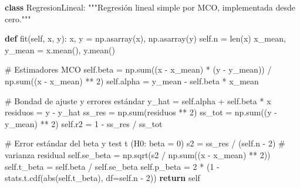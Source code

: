\documentclass[
  spanish,
  letterpaper,
  DIV=11,
  numbers=noendperiod]{scrreprt}
\newenvironment{Shaded}{\begin{snugshade}}{\end{snugshade}}
\newcommand{\BuiltInTok}[1]{\textcolor[rgb]{0.00,0.23,0.31}{#1}}
\newcommand{\CommentTok}[1]{\textcolor[rgb]{0.37,0.37,0.37}{#1}}
\newcommand{\ControlFlowTok}[1]{\textcolor[rgb]{0.00,0.23,0.31}{\textbf{#1}}}
\newcommand{\DecValTok}[1]{\textcolor[rgb]{0.68,0.00,0.00}{#1}}
\newcommand{\KeywordTok}[1]{\textcolor[rgb]{0.00,0.23,0.31}{\textbf{#1}}}
\newcommand{\NormalTok}[1]{\textcolor[rgb]{0.00,0.23,0.31}{#1}}
\newcommand{\OperatorTok}[1]{\textcolor[rgb]{0.37,0.37,0.37}{#1}}
\newcommand{\VariableTok}[1]{\textcolor[rgb]{0.07,0.07,0.07}{#1}}
\begin{document}
\label{clase-regresion}
\begin{Shaded}
\begin{Highlighting}[]
\KeywordTok{class}\NormalTok{ RegresionLineal:}
    \CommentTok{"""Regresión lineal simple por MCO, implementada desde cero."""}

    \KeywordTok{def}\NormalTok{ fit(}\VariableTok{self}\NormalTok{, x, y):}
\NormalTok{        x, y }\OperatorTok{=}\NormalTok{ np.asarray(x), np.asarray(y)}
        \VariableTok{self}\NormalTok{.n }\OperatorTok{=} \BuiltInTok{len}\NormalTok{(x)}
\NormalTok{        x\_mean, y\_mean }\OperatorTok{=}\NormalTok{ x.mean(), y.mean()}

        \CommentTok{\# Estimadores MCO}
        \VariableTok{self}\NormalTok{.beta }\OperatorTok{=}\NormalTok{ np.}\BuiltInTok{sum}\NormalTok{((x }\OperatorTok{{-}}\NormalTok{ x\_mean) }\OperatorTok{*}\NormalTok{ (y }\OperatorTok{{-}}\NormalTok{ y\_mean)) }\OperatorTok{/}\NormalTok{ np.}\BuiltInTok{sum}\NormalTok{((x }\OperatorTok{{-}}\NormalTok{ x\_mean) }\OperatorTok{**} \DecValTok{2}\NormalTok{)}
        \VariableTok{self}\NormalTok{.alpha }\OperatorTok{=}\NormalTok{ y\_mean }\OperatorTok{{-}} \VariableTok{self}\NormalTok{.beta }\OperatorTok{*}\NormalTok{ x\_mean}

        \CommentTok{\# Bondad de ajuste y errores estándar}
\NormalTok{        y\_hat }\OperatorTok{=} \VariableTok{self}\NormalTok{.alpha }\OperatorTok{+} \VariableTok{self}\NormalTok{.beta }\OperatorTok{*}\NormalTok{ x}
\NormalTok{        residuos }\OperatorTok{=}\NormalTok{ y }\OperatorTok{{-}}\NormalTok{ y\_hat}
\NormalTok{        ss\_res }\OperatorTok{=}\NormalTok{ np.}\BuiltInTok{sum}\NormalTok{(residuos }\OperatorTok{**} \DecValTok{2}\NormalTok{)}
\NormalTok{        ss\_tot }\OperatorTok{=}\NormalTok{ np.}\BuiltInTok{sum}\NormalTok{((y }\OperatorTok{{-}}\NormalTok{ y\_mean) }\OperatorTok{**} \DecValTok{2}\NormalTok{)}
        \VariableTok{self}\NormalTok{.r2 }\OperatorTok{=} \DecValTok{1} \OperatorTok{{-}}\NormalTok{ ss\_res }\OperatorTok{/}\NormalTok{ ss\_tot}

        \CommentTok{\# Error estándar del beta y test t (H0: beta = 0)}
\NormalTok{        s2 }\OperatorTok{=}\NormalTok{ ss\_res }\OperatorTok{/}\NormalTok{ (}\VariableTok{self}\NormalTok{.n }\OperatorTok{{-}} \DecValTok{2}\NormalTok{)                       }\CommentTok{\# varianza residual}
        \VariableTok{self}\NormalTok{.se\_beta }\OperatorTok{=}\NormalTok{ np.sqrt(s2 }\OperatorTok{/}\NormalTok{ np.}\BuiltInTok{sum}\NormalTok{((x }\OperatorTok{{-}}\NormalTok{ x\_mean) }\OperatorTok{**} \DecValTok{2}\NormalTok{))}
        \VariableTok{self}\NormalTok{.t\_beta }\OperatorTok{=} \VariableTok{self}\NormalTok{.beta }\OperatorTok{/} \VariableTok{self}\NormalTok{.se\_beta}
        \VariableTok{self}\NormalTok{.p\_beta }\OperatorTok{=} \DecValTok{2} \OperatorTok{*}\NormalTok{ (}\DecValTok{1} \OperatorTok{{-}}\NormalTok{ stats.t.cdf(}\BuiltInTok{abs}\NormalTok{(}\VariableTok{self}\NormalTok{.t\_beta), df}\OperatorTok{=}\VariableTok{self}\NormalTok{.n }\OperatorTok{{-}} \DecValTok{2}\NormalTok{))}
        \ControlFlowTok{return} \VariableTok{self}


\end{Highlighting}
\end{Shaded}
\end{document}
